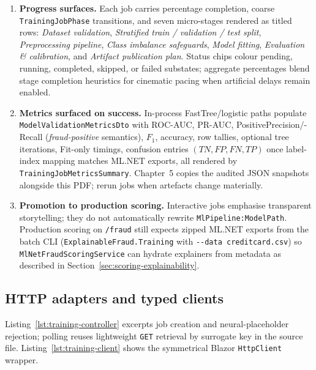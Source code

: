 \begin{enumerate}
    \item \textbf{Progress surfaces.} Each job carries percentage completion, coarse \texttt{Training\allowbreak Job\allowbreak Phase} transitions, and seven micro-stages rendered as titled rows: \emph{Dataset validation}, \emph{Stratified train / validation / test split}, \emph{Preprocessing pipeline}, \emph{Class imbalance safeguards}, \emph{Model fitting}, \emph{Evaluation \& calibration}, and \emph{Artifact publication plan}. Status chips colour pending, running, completed, skipped, or failed substates; aggregate percentages blend stage completion heuristics for cinematic pacing when artificial delays remain enabled.
    \item \textbf{Metrics surfaced on success.} In-process FastTree/logistic paths populate \texttt{Model\allowbreak Validation\allowbreak Metrics\allowbreak Dto} with ROC-AUC, PR-AUC, PositivePrecision/-Recall (\emph{fraud-positive} semantics), $F_{1}$, accuracy, row tallies, optional tree iterations, Fit-only timings, confusion entries $(TN,FP,FN,TP)$ once label-index mapping matches ML.NET exports, all rendered by \texttt{TrainingJob\allowbreak Metrics\allowbreak Summary}. Chapter~5 copies the audited JSON snapshots alongside this PDF; rerun jobs when artefacts change materially.
    \item \textbf{Promotion to production scoring.} Interactive jobs emphasise transparent storytelling; they do not automatically rewrite \texttt{MlPipeline:\allowbreak ModelPath}. Production scoring on \texttt{/fraud} still expects zipped ML.NET exports from the batch CLI (\texttt{Explainable\allowbreak Fraud.\allowbreak Training} with \texttt{-{}-data creditcard.csv}) so \texttt{MlNet\allowbreak Fraud\allowbreak ScoringService} can hydrate explainers from metadata as described in Section~\ref{sec:scoring-explainability}.
\end{enumerate}

\clearpage
\subsection{HTTP adapters and typed clients}
Listing~\ref{lst:training-controller} excerpts job creation and neural-placeholder rejection; polling reuses lightweight \texttt{GET} retrieval by surrogate key in the source file. Listing~\ref{lst:training-client} shows the symmetrical Blazor \texttt{HttpClient} wrapper.



